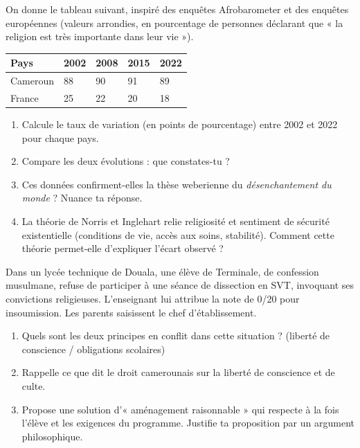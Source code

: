 \documentclass[11pt]{article}
\begin{document}
\begin{exercice}
On donne le tableau suivant, inspiré des enquêtes Afrobarometer et des enquêtes européennes (valeurs arrondies, en pourcentage de personnes déclarant que « la religion est très importante dans leur vie »).

\begin{center}
\begin{tabularx}{\linewidth}{|l|X|X|X|X|}
\hline
\rowcolor{popblueL} \textbf{Pays} & \textbf{2002} & \textbf{2008} & \textbf{2015} & \textbf{2022} \\
\hline
Cameroun & 88 & 90 & 91 & 89 \\
\hline
France & 25 & 22 & 20 & 18 \\
\hline
\end{tabularx}
\end{center}

\begin{enumerate}
\item Calcule le taux de variation (en points de pourcentage) entre 2002 et 2022 pour chaque pays.
\item Compare les deux évolutions : que constates-tu ?
\item Ces données confirment-elles la thèse weberienne du \emph{désenchantement du monde} ? Nuance ta réponse.
\item La théorie de Norris et Inglehart relie religiosité et sentiment de sécurité existentielle (conditions de vie, accès aux soins, stabilité). Comment cette théorie permet-elle d'expliquer l'écart observé ?
\end{enumerate}
\end{exercice}

\begin{exercice}
Dans un lycée technique de Douala, une élève de Terminale, de confession musulmane, refuse de participer à une séance de dissection en SVT, invoquant ses convictions religieuses. L'enseignant lui attribue la note de 0/20 pour insoumission. Les parents saisissent le chef d'établissement.
\begin{enumerate}
\item Quels sont les deux principes en conflit dans cette situation ? (liberté de conscience / obligations scolaires)
\item Rappelle ce que dit le droit camerounais sur la liberté de conscience et de culte.
\item Propose une solution d'« aménagement raisonnable » qui respecte à la fois l'élève et les exigences du programme. Justifie ta proposition par un argument philosophique.
\end{enumerate}
\end{exercice}
\end{document}
